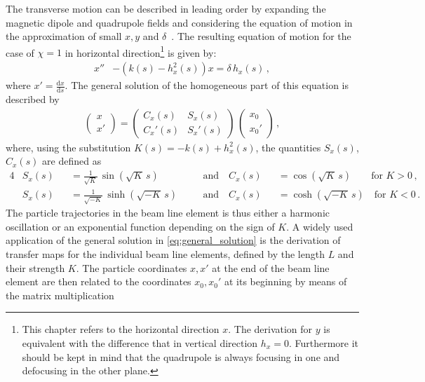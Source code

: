 The transverse motion can be described in leading order by expanding the magnetic dipole and quadrupole fields and considering the equation of motion in the approximation of small $x,y$ and $\delta$~\cite{lee2012accelerator}. The resulting equation of motion for the case of $\chi=1$ in horizontal direction\footnote{This chapter refers to the horizontal direction $x$. The derivation for $y$ is equivalent with the difference that in vertical direction $h_x=0$. Furthermore it should be kept in mind that the quadrupole is always focusing in one and defocusing in the other plane.} is given by:
\begin{align}
x'' &- \left(k(s) - h_x^2(s)\right) x = \delta \, h_x (s) \, , \label{eq:hill1} 
\end{align}
%
where $x'= \frac{\mathrm{d}x}{\mathrm{d}s}$. The general solution of the homogeneous part of this equation is described by 
\begin{align}
\begin{pmatrix} x \\ x' \end{pmatrix} = \begin{pmatrix} C_x (s) & S_x(s) \\ C_x'(s) & S_x'(s)  \end{pmatrix} \, \begin{pmatrix} x_0 \\ x_0' \end{pmatrix}\, , \label{eq:general_solution}
\end{align}
where, using the substitution $K(s) = -k(s)+h_x^2(s)$, the quantities $S_x(s)$, $C_x(s)$ are defined as
%
\begin{alignat}{4}
&S_x(s) &&= \frac{1}{\sqrt{K}} \, \sin \left( \sqrt{K} \, s \right) \quad && \text{and}  \quad  C_x (s) &&= \cos \left(\sqrt{K} \, s\right) \quad \quad \text{for } K>0 \,,\\ 
&S_x(s) &&= \frac{1}{\sqrt{-K}} \, \sinh \left( \sqrt{-K} \, s \right)  \quad && \text{and}  \quad   C_x (s) &&= \cosh \left(\sqrt{-K} \, s\right) \quad  \text{for } K<0\,. 
\end{alignat}
%
The particle trajectories in the beam line element is thus either a harmonic oscillation or an exponential function depending on the sign of $K$. A widely used application of the general solution in \eqref{eq:general_solution} is the derivation of transfer maps for the individual beam line elements, defined by the length $L$ and their strength $K$. The particle coordinates $x,x'$ at the end of the beam line element are then related to the coordinates $x_0,x_0'$ at its beginning by means of the matrix multiplication
